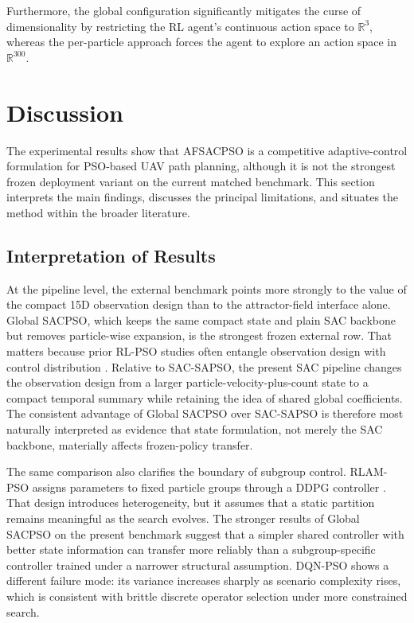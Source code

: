 \documentclass[final,5p,times]{elsarticle}
\begin{document}
Furthermore, the global configuration significantly mitigates the curse of dimensionality by restricting the RL agent's continuous action space to $\mathbb{R}^3$, whereas the per-particle approach forces the agent to explore an action space in $\mathbb{R}^{300}$.

\section{Discussion}
\label{sec:discussion}
The experimental results show that AFSACPSO is a competitive adaptive-control formulation for PSO-based UAV path planning, although it is not the strongest frozen deployment variant on the current matched benchmark.
This section interprets the main findings, discusses the principal limitations, and situates the method within the broader literature.
\subsection{Interpretation of Results}
At the pipeline level, the external benchmark points more strongly to the value of the compact 15D observation design than to the attractor-field interface alone. Global SACPSO, which keeps the same compact state and plain SAC backbone but removes particle-wise expansion, is the strongest frozen external row. That matters because prior RL-PSO studies often entangle observation design with control distribution \cite{Yin2023RLAMPSO, vonEschwege2024Soft, Meng2023Multistrategy, Li2023Reinforcement}. Relative to SAC-SAPSO, the present SAC pipeline changes the observation design from a larger particle-velocity-plus-count state to a compact temporal summary while retaining the idea of shared global coefficients. The consistent advantage of Global SACPSO over SAC-SAPSO is therefore most naturally interpreted as evidence that state formulation, not merely the SAC backbone, materially affects frozen-policy transfer.

The same comparison also clarifies the boundary of subgroup control. RLAM-PSO assigns parameters to fixed particle groups through a DDPG controller \cite{Yin2023RLAMPSO}. That design introduces heterogeneity, but it assumes that a static partition remains meaningful as the search evolves. The stronger results of Global SACPSO on the present benchmark suggest that a simpler shared controller with better state information can transfer more reliably than a subgroup-specific controller trained under a narrower structural assumption. DQN-PSO shows a different failure mode: its variance increases sharply as scenario complexity rises, which is consistent with brittle discrete operator selection under more constrained search.
\end{document}

